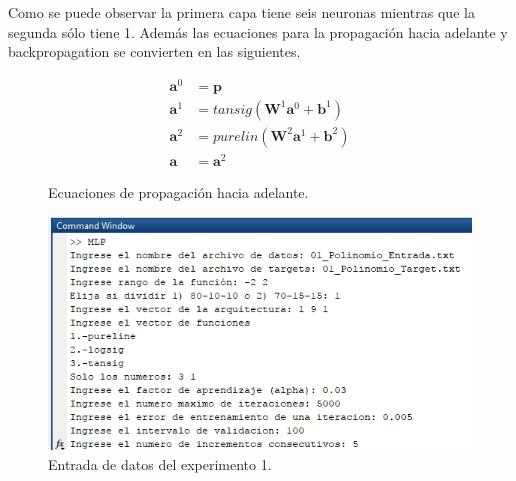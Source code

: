 Como se puede observar la primera capa tiene seis neuronas mientras que la segunda sólo tiene 1. Además las ecuaciones para la propagación hacia adelante y backpropagation se convierten en las siguientes.
\begin{figure}[H]
    \begin{align*}
        \boldsymbol{a}^0 &= \boldsymbol{p} \\
        \boldsymbol{a}^{1} &= tansig(\boldsymbol{W}^{1}\boldsymbol{a}^{0}+\boldsymbol{b}^{1}
        ) \\
        \boldsymbol{a}^{2} &= purelin(\boldsymbol{W}^{2}\boldsymbol{a}^{1}+\boldsymbol{b}^{2}
        ) \\
        \boldsymbol{a} &= \boldsymbol{a}^{2}
    \end{align*}
    \caption{Ecuaciones de propagación hacia adelante.}
\end{figure}
\begin{figure}[H]
    \begin{center}
        \includegraphics[width=13cm]{1/entrada.png}
        \caption{Entrada de datos del experimento 1.}
        \label{fig:entrada1}
    \end{center}
\end{figure}
